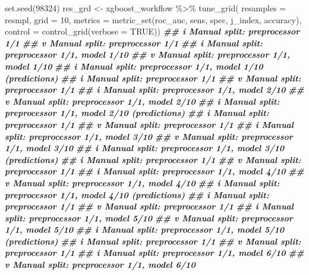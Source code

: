\documentclass[
]{article}
\newenvironment{Shaded}{\begin{snugshade}}{\end{snugshade}}
\newcommand{\AttributeTok}[1]{\textcolor[rgb]{0.77,0.63,0.00}{#1}}
\newcommand{\ConstantTok}[1]{\textcolor[rgb]{0.00,0.00,0.00}{#1}}
\newcommand{\DecValTok}[1]{\textcolor[rgb]{0.00,0.00,0.81}{#1}}
\newcommand{\DocumentationTok}[1]{\textcolor[rgb]{0.56,0.35,0.01}{\textbf{\textit{#1}}}}
\newcommand{\FunctionTok}[1]{\textcolor[rgb]{0.00,0.00,0.00}{#1}}
\newcommand{\NormalTok}[1]{#1}
\newcommand{\OtherTok}[1]{\textcolor[rgb]{0.56,0.35,0.01}{#1}}
\newcommand{\SpecialCharTok}[1]{\textcolor[rgb]{0.00,0.00,0.00}{#1}}
\begin{document}
\begin{Shaded}
\begin{Highlighting}[]
\FunctionTok{set.seed}\NormalTok{(}\DecValTok{98324}\NormalTok{)}
\NormalTok{res\_grd }\OtherTok{\textless{}{-}}
\NormalTok{  xgboost\_workflow }\SpecialCharTok{\%\textgreater{}\%}
  \FunctionTok{tune\_grid}\NormalTok{(}
    \AttributeTok{resamples =}\NormalTok{ resmpl,}
    \AttributeTok{grid =} \DecValTok{10}\NormalTok{,}
    \AttributeTok{metrics =} \FunctionTok{metric\_set}\NormalTok{(roc\_auc, sens, spec, j\_index, accuracy),}
    \AttributeTok{control =} \FunctionTok{control\_grid}\NormalTok{(}\AttributeTok{verbose =} \ConstantTok{TRUE}\NormalTok{))}
\DocumentationTok{\#\# i Manual split: preprocessor 1/1}
\DocumentationTok{\#\# v Manual split: preprocessor 1/1}
\DocumentationTok{\#\# i Manual split: preprocessor 1/1, model 1/10}
\DocumentationTok{\#\# v Manual split: preprocessor 1/1, model 1/10}
\DocumentationTok{\#\# i Manual split: preprocessor 1/1, model 1/10 (predictions)}
\DocumentationTok{\#\# i Manual split: preprocessor 1/1}
\DocumentationTok{\#\# v Manual split: preprocessor 1/1}
\DocumentationTok{\#\# i Manual split: preprocessor 1/1, model 2/10}
\DocumentationTok{\#\# v Manual split: preprocessor 1/1, model 2/10}
\DocumentationTok{\#\# i Manual split: preprocessor 1/1, model 2/10 (predictions)}
\DocumentationTok{\#\# i Manual split: preprocessor 1/1}
\DocumentationTok{\#\# v Manual split: preprocessor 1/1}
\DocumentationTok{\#\# i Manual split: preprocessor 1/1, model 3/10}
\DocumentationTok{\#\# v Manual split: preprocessor 1/1, model 3/10}
\DocumentationTok{\#\# i Manual split: preprocessor 1/1, model 3/10 (predictions)}
\DocumentationTok{\#\# i Manual split: preprocessor 1/1}
\DocumentationTok{\#\# v Manual split: preprocessor 1/1}
\DocumentationTok{\#\# i Manual split: preprocessor 1/1, model 4/10}
\DocumentationTok{\#\# v Manual split: preprocessor 1/1, model 4/10}
\DocumentationTok{\#\# i Manual split: preprocessor 1/1, model 4/10 (predictions)}
\DocumentationTok{\#\# i Manual split: preprocessor 1/1}
\DocumentationTok{\#\# v Manual split: preprocessor 1/1}
\DocumentationTok{\#\# i Manual split: preprocessor 1/1, model 5/10}
\DocumentationTok{\#\# v Manual split: preprocessor 1/1, model 5/10}
\DocumentationTok{\#\# i Manual split: preprocessor 1/1, model 5/10 (predictions)}
\DocumentationTok{\#\# i Manual split: preprocessor 1/1}
\DocumentationTok{\#\# v Manual split: preprocessor 1/1}
\DocumentationTok{\#\# i Manual split: preprocessor 1/1, model 6/10}
\DocumentationTok{\#\# v Manual split: preprocessor 1/1, model 6/10}

\end{Highlighting}
\end{Shaded}
\end{document}
